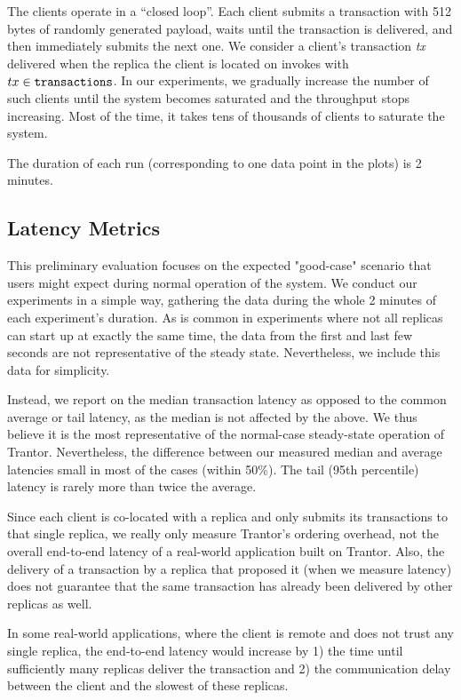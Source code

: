\documentclass{article}
\begin{document}
The clients operate in a “closed loop”.
Each client submits a transaction with 512 bytes of randomly generated payload, waits until the transaction is delivered, and then immediately submits the next one.
We consider a client's transaction \textit{tx} delivered when the replica the client is located on invokes  with $tx \in \texttt{transactions}$.
In our experiments, we gradually increase the number of such clients until the system becomes saturated and the throughput stops increasing.
Most of the time, it takes tens of thousands of clients to saturate the system.

The duration of each run (corresponding to one data point in the plots) is 2 minutes.

\subsection{Latency Metrics}

This preliminary evaluation focuses on the expected "good-case" scenario that users might expect during normal operation of the system.
We conduct our experiments in a simple way, gathering the data during the whole 2 minutes of each experiment's duration.
As is common in experiments where not all replicas can start up at exactly the same time,
the data from the first and last few seconds are not representative of the steady state.
Nevertheless, we include this data for simplicity.

Instead, we report on the median transaction latency as opposed to the common average or tail latency, as the median is not affected by the above.
We thus believe it is the most representative of the normal-case steady-state operation of Trantor.
Nevertheless, the difference between our measured median and average latencies small in most of the cases (within 50\%).
The tail (95th percentile) latency is rarely more than twice the average.

Since each client is co-located with a replica and only submits its transactions to that single replica,
we really only measure Trantor's ordering overhead, not the overall end-to-end latency of a real-world application built on Trantor.
Also, the delivery of a transaction by a replica that proposed it (when we measure latency)
does not guarantee that the same transaction has already been delivered by other replicas as well.

In some real-world applications, where the client is remote and does not trust any single replica,
the end-to-end latency would increase by
1) the time until sufficiently many replicas deliver the transaction and
2) the communication delay between the client and the slowest of these replicas.
\end{document}
